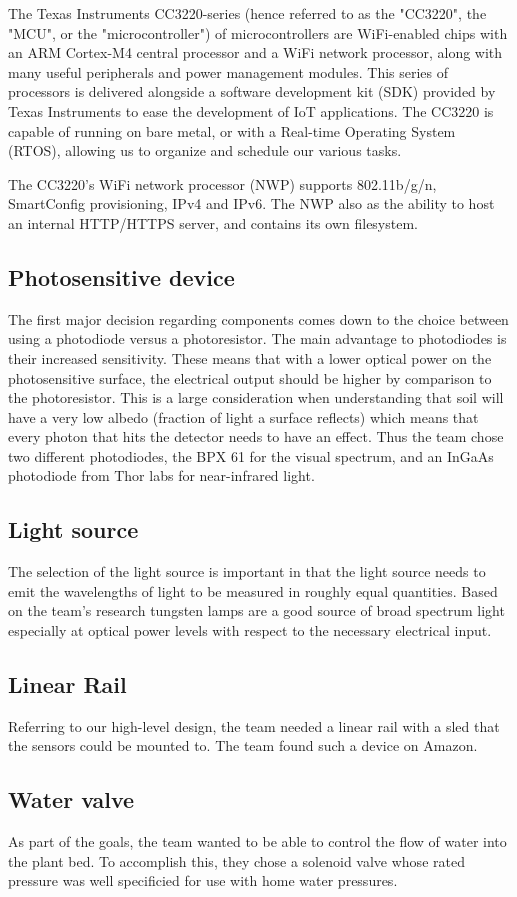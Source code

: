 \documentclass[journal]{IEEEtran}
\begin{document}
The Texas Instruments CC3220-series (hence referred to as the "CC3220", the "MCU", or the "microcontroller") of microcontrollers are WiFi-enabled chips with an ARM Cortex-M4 central processor and a WiFi network processor, along with many useful peripherals and power management modules. This series of processors is delivered alongside a software development kit (SDK) provided by Texas Instruments to ease the development of IoT applications. The CC3220 is capable of running on bare metal, or with a Real-time Operating System (RTOS), allowing us to organize and schedule our various tasks.

The CC3220's WiFi network processor (NWP) supports 802.11b/g/n, SmartConfig provisioning, IPv4 and IPv6. The NWP also as the ability to host an internal HTTP/HTTPS server, and contains its own filesystem.
\subsection{Photosensitive device}
The first major decision regarding components comes down to the choice between using a photodiode versus
a photoresistor. The main advantage to photodiodes is their increased sensitivity. These means that with a lower
optical power on the photosensitive surface, the electrical output should be higher by comparison to the photoresistor.
This is a large consideration when understanding that soil will have a very low albedo (fraction of light a surface reflects)
which means that every photon that hits the detector needs to have an effect.
Thus the team chose two different photodiodes, the BPX 61 for the visual spectrum, and an InGaAs photodiode from Thor labs
for near-infrared light.
\subsection{Light source}
The selection of the light source is important in that the light source needs to emit the wavelengths
of light to be measured in roughly equal quantities. Based on the team's research tungsten lamps are a good source
of broad spectrum light especially at optical power levels with respect to the necessary electrical input.
\subsection{Linear Rail}
Referring to our high-level design, the team needed a linear rail with a sled that the sensors could be mounted to.
The team found such a device on Amazon.
\subsection{Water valve}
As part of the goals, the team wanted to be able to control the flow of water
into the plant bed. To accomplish this, they chose a solenoid valve whose rated pressure was well specificied for use with home water pressures.
\end{document}
